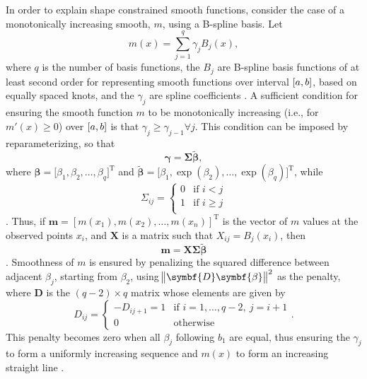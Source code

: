 In order to explain shape constrained smooth functions, consider the case of a monotonically increasing smooth, \(m\), using a B-spline basis.  Let
\begin{equation}
  \label{eq:SCAMMonotonicallyIncreasingSmooth}
  m(x) = \sum_{j = 1}^q \gamma_j B_j(x),
\end{equation}
where \(q\) is the number of basis functions, the \(B_j\) are B-spline basis functions of at least second order for representing smooth functions over interval \(\interval{a}{b}\), based on equally spaced knots, and the \(\gamma_j\) are spline coefficients \parencite{Pya2015}.  A sufficient condition for ensuring the smooth function \(m\) to be monotonically increasing (i.e., for \(m'(x) \geq 0\)) over \(\interval{a}{b}\) is that \(\gamma_j \geq \gamma_{j -1} \forall j\).  This condition can be imposed by reparameterizing, so that
\begin{equation}
  \label{eq:SCAMReparameterizedGamma}
  \symbf{\gamma} = \symbf{\Sigma} \tilde{\symbf{\beta}},
\end{equation}
where \(\symbf{\beta} = \bigl[\beta_1, \beta_2, \ldots, \beta_q\bigr]^{\text{T}}\) and \(\tilde{\symbf{\beta}} = \bigl[\beta_1, \exp(\beta_2), \ldots, \exp(\beta_q)\bigr]^{\text{T}}\), while
\begin{equation}
  \label{eq:SCAMSigmaMontoneIncreasing}
  \Sigma_{i j} =
  \begin{cases}
    0 &\text{if } i < j \\
    1 &\text{if } i \geq j \\
  \end{cases}
\end{equation}
\parencite{Pya2015}.
Thus, if \(\symbf{m} = [m(x_1), m(x_2), \ldots, m(x_n)]^{\text{T}}\) is the vector of \(m\) values at the observed points \(x_i\), and \(\symbf{X}\) is a matrix such that \(X_{i j} = B_j(x_i)\), then
\begin{equation}
  \label{eq:SCAMConstrainedSmootherVector}
  \symbf{m} = \symbf{X} \symbf{\Sigma} \tilde{\symbf{\beta}}
\end{equation}
\parencite{Pya2015}.
Smoothness of \(m\) is ensured by penalizing the squared difference between adjacent \(\beta_j\), starting from \(\beta_2\), using \(\norm{\symbf{D} \symbf{\beta}}^2\) as the penalty, where \(\symbf{D}\) is the \((q-2) \times q\) matrix
whose elements are given by
\begin{equation}
  \label{eq:SCAMDMonotoneIncreasing}
  D_{i j} = 
  \begin{cases}
    - D_{i j + 1} = 1 &\text{if } i = 1, \ldots, q - 2,~ j = i + 1 \\
    0 &\text{otherwise}
  \end{cases}.
\end{equation}
This penalty becomes zero when all \(\beta_j\) following \(b_1\) are equal, thus ensuring the \(\gamma_j\) to form a uniformly increasing sequence and \(m(x)\) to form an increasing straight line \parencite{Pya2015}.

